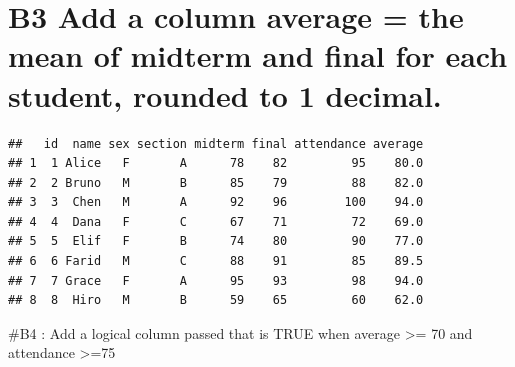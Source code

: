 \documentclass[
]{article}
\newenvironment{Shaded}{\begin{snugshade}}{\end{snugshade}}
\newcommand{\DecValTok}[1]{\textcolor[rgb]{0.00,0.00,0.81}{#1}}
\newcommand{\FunctionTok}[1]{\textcolor[rgb]{0.13,0.29,0.53}{\textbf{#1}}}
\newcommand{\NormalTok}[1]{#1}
\newcommand{\OtherTok}[1]{\textcolor[rgb]{0.56,0.35,0.01}{#1}}
\newcommand{\SpecialCharTok}[1]{\textcolor[rgb]{0.81,0.36,0.00}{\textbf{#1}}}
\begin{document}
\section{B3 Add a column average = the mean of midterm and final for
each student, rounded to 1
decimal.}\label{b3-add-a-column-average-the-mean-of-midterm-and-final-for-each-student-rounded-to-1-decimal.}

\begin{Shaded}
\end{Shaded}

\begin{verbatim}
##   id  name sex section midterm final attendance average
## 1  1 Alice   F       A      78    82         95    80.0
## 2  2 Bruno   M       B      85    79         88    82.0
## 3  3  Chen   M       A      92    96        100    94.0
## 4  4  Dana   F       C      67    71         72    69.0
## 5  5  Elif   F       B      74    80         90    77.0
## 6  6 Farid   M       C      88    91         85    89.5
## 7  7 Grace   F       A      95    93         98    94.0
## 8  8  Hiro   M       B      59    65         60    62.0
\end{verbatim}

\#B4 : Add a logical column passed that is TRUE when average
\textgreater= 70 and attendance \textgreater=75

\begin{Shaded}
\end{Shaded}
\end{document}
